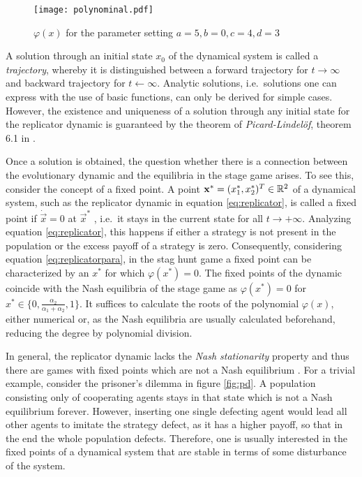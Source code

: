 \begin{figure}[h]
        \centering
        \texttt{[image: polynominal.pdf]}
        \caption[Polynomial of the Replicator Dynamic]{$\varphi(x)$ for the parameter setting $a=5, b=0, c=4, d=3$}
        \label{fig:polynomial}
\end{figure}
A solution through an initial state $x_0$ of the dynamical system is called a 
\textit{trajectory}, whereby it is distinguished between a forward trajectory 
for $t \rightarrow \infty$ and backward trajectory for $t \leftarrow \infty$.
Analytic solutions, i.e.\ solutions one can express with the use of
basic functions, can only be derived for simple cases. 
However, the existence and uniqueness of a solution through
any initial state for the replicator dynamic is guaranteed by the theorem 
of \textit{Picard-Lindel\"of}, theorem 6.1 in 
\textcite[74]{weibull_evolutionary_1997}. 

Once a solution is obtained, the question whether there 
is a connection between the evolutionary dynamic and the equilibria in the 
stage game arises. To see this, consider the concept of a fixed point.
A point $\mathbf{x}^*=(x^*_1,x^*_2)^T \in \mathbb{R}^2$ of a dynamical system, such as the replicator 
dynamic in equation \eqref{eq:replicator}, is called a fixed point
if $\dot{\vec{x}} = 0$ at $\vec{x}^*$ , i.e.\ it stays in the 
current state for all $t \rightarrow + \infty $. 
Analyzing equation \eqref{eq:replicator}, 
this happens if either a strategy
is not present in the population or the excess payoff of a strategy is zero. 
Consequently, considering equation \eqref{eq:replicatorpara}, in the stag 
hunt game a fixed point can be characterized by an $x^*$ for which
$\varphi(x^*) = 0$.
The fixed points of the dynamic coincide 
with the Nash equilibria of the stage game as 
$\varphi(x^*) = 0$ for $x^* \in \{0,\frac{\alpha_2}{\alpha_1+\alpha_2},1\}$. 
It suffices to calculate the roots of the polynomial $\varphi(x)$, either
numerical or, as the Nash equilibria are usually calculated beforehand,
reducing the degree by polynomial division. 

In general, the replicator 
dynamic lacks the \textit{Nash stationarity} property and thus there are 
games with fixed points which are not a Nash equilibrium
\parencite{sandholm_population_2010}.
For a trivial example, consider the prisoner's dilemma in figure \ref{fig:pd}. 
A population consisting only of cooperating agents stays in that state
which is not a Nash equilibrium forever. However, inserting one single 
defecting agent would lead all other agents to imitate the strategy defect,
as it has a higher payoff, so that in the end the whole population defects.
Therefore, one is usually interested in the fixed points of 
a dynamical system that are stable in terms of some 
disturbance of the system. 

